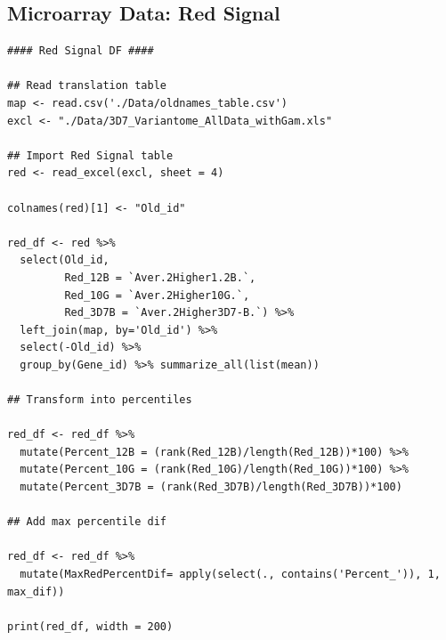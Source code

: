 \documentclass[11pt]{article}
\begin{document}
\subsection{Microarray Data: Red Signal}
\label{sec:orgcf7f3c9}

\begin{verbatim}
#### Red Signal DF ####

## Read translation table
map <- read.csv('./Data/oldnames_table.csv')
excl <- "./Data/3D7_Variantome_AllData_withGam.xls"

## Import Red Signal table
red <- read_excel(excl, sheet = 4)

colnames(red)[1] <- "Old_id"

red_df <- red %>%
  select(Old_id,
         Red_12B = `Aver.2Higher1.2B.`,
         Red_10G = `Aver.2Higher10G.`,
         Red_3D7B = `Aver.2Higher3D7-B.`) %>%
  left_join(map, by='Old_id') %>%
  select(-Old_id) %>%
  group_by(Gene_id) %>% summarize_all(list(mean))

## Transform into percentiles

red_df <- red_df %>%
  mutate(Percent_12B = (rank(Red_12B)/length(Red_12B))*100) %>%
  mutate(Percent_10G = (rank(Red_10G)/length(Red_10G))*100) %>%
  mutate(Percent_3D7B = (rank(Red_3D7B)/length(Red_3D7B))*100)

## Add max percentile dif

red_df <- red_df %>%
  mutate(MaxRedPercentDif= apply(select(., contains('Percent_')), 1, max_dif))

print(red_df, width = 200)
\end{verbatim}
\end{document}
